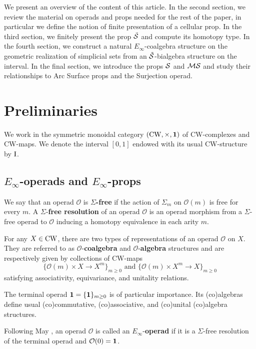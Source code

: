 We present an overview of the content of this article. In the second section, we review the material on operads and props needed for the rest of the paper, in particular we define the notion of finite presentation of a cellular prop. In the third section, we finitely present the prop $\tilde{\S}$ and compute its homotopy type. In the fourth section, we construct a natural $E_\infty$-coalgebra structure on the geometric realization of simplicial sets from an $\tilde{\S}$-bialgebra structure on the interval. In the final section, we introduce the props $\S$ and $\MS$ and study their relationships to Arc Surface props and the Surjection operad.


\section{Preliminaries}

We work in the symmetric monoidal category $(\CW,\times,\1)$ of CW-complexes and CW-maps. We denote the interval $[0,1]$ endowed with its usual CW-structure by $\I$.

\subsection{$E_\infty$-operads and $E_\infty$-props}

We say that an operad $\mathcal{O}$ is $\Sigma$\textbf{-free} if the action of $\Sigma_m$ on $\mathcal{O}(m)$ is free for every $m$. A $\Sigma$-\textbf{free resolution} of an operad $\mathcal{O}$ is an operad morphism from a $\Sigma$-free operad to $\mathcal{O}$ inducing a homotopy equivalence in each arity $m$. 

For any $X \in \CW$, there are two types of representations of an operad $\mathcal{O}$ on $X$. They are referred to as $\mathcal{O}$-\textbf{coalgebra} and $\mathcal{O}$-\textbf{algebra} structures and are respectively given by collections of CW-maps
\begin{equation*}
\{\mathcal{O}(m) \times X \to X^m\}_{m \geq 0} \text{ \ and \ } \{\mathcal{O}(m) \times X^m \to X\}_{m \geq 0}
\end{equation*}	
satisfying associativity, equivariance, and unitality relations.

The terminal operad $\1 = \{\1\}_{m\geq0}$ is of particular importance. Its (co)algebras define usual (co)commutative, (co)associative, and (co)unital (co)algebra structures. 

Following May \cite{may2006geometry}, an operad $\mathcal{O}$ is called an $E_\infty$-\textbf{operad} if it is a $\Sigma$-free resolution of the terminal operad and $\mathcal{O}(0)=\1$.

